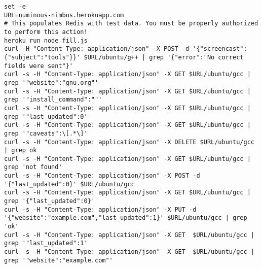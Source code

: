 \documentclass[12pt]{article}
\begin{document}
\begin{lstlisting}
set -e
URL=numinous-nimbus.herokuapp.com
# This populates Redis with test data. You must be properly authorized to perform this action!
heroku run node fill.js
curl -H "Content-Type: application/json" -X POST -d '{"screencast":{"subject":"tools"}}' $URL/ubuntu/g++ | grep '{"error":"No correct fields were sent"}'
curl -s -H "Content-Type: application/json" -X GET $URL/ubuntu/gcc | grep '"website":"gnu.org"'
curl -s -H "Content-Type: application/json" -X GET $URL/ubuntu/gcc | grep '"install_command":""'
curl -s -H "Content-Type: application/json" -X GET $URL/ubuntu/gcc | grep '"last_updated":0'
curl -s -H "Content-Type: application/json" -X GET $URL/ubuntu/gcc | grep '"caveats":\[.*\]'
curl -s -H "Content-Type: application/json" -X DELETE $URL/ubuntu/gcc | grep ok
curl -s -H "Content-Type: application/json" -X GET $URL/ubuntu/gcc | grep 'not found'
curl -s -H "Content-Type: application/json" -X POST -d '{"last_updated":0}' $URL/ubuntu/gcc
curl -s -H "Content-Type: application/json" -X GET $URL/ubuntu/gcc | grep '{"last_updated":0}'
curl -s -H "Content-Type: application/json" -X PUT -d '{"website":"example.com","last_updated":1}' $URL/ubuntu/gcc | grep 'ok'
curl -s -H "Content-Type: application/json" -X GET  $URL/ubuntu/gcc | grep '"last_updated":1'
curl -s -H "Content-Type: application/json" -X GET  $URL/ubuntu/gcc | grep '"website":"example.com"'
\end{lstlisting}
\end{document}
